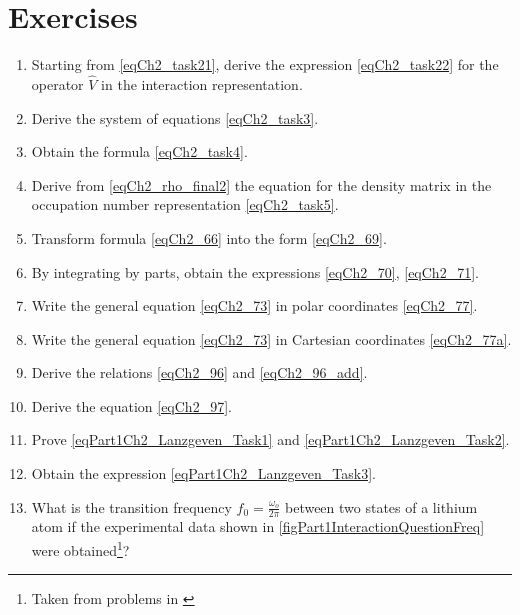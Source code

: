 \section{Exercises}
\begin{enumerate}
\item Starting from \eqref{eqCh2_task21}, derive the expression
  \eqref{eqCh2_task22} for the operator $\hat{V}$ in the interaction
  representation. 
\item Derive the system of equations \eqref{eqCh2_task3}.
\item Obtain the formula \eqref{eqCh2_task4}.
\item Derive from \eqref{eqCh2_rho_final2} the equation for the density
  matrix in the occupation number representation \eqref{eqCh2_task5}. 
\item Transform formula \eqref{eqCh2_66} into the form \eqref{eqCh2_69}.
\item By integrating by parts, obtain the expressions \eqref{eqCh2_70},
  \eqref{eqCh2_71}.
\item Write the general equation \eqref{eqCh2_73} in polar coordinates
  \eqref{eqCh2_77}. 
\item Write the general equation \eqref{eqCh2_73} in Cartesian
  coordinates \eqref{eqCh2_77a}. 
\item Derive the relations \eqref{eqCh2_96} and \eqref{eqCh2_96_add}.
\item Derive the equation \eqref{eqCh2_97}.
\item Prove \eqref{eqPart1Ch2_Lanzgeven_Task1} and \eqref{eqPart1Ch2_Lanzgeven_Task2}.
\item Obtain the expression \eqref{eqPart1Ch2_Lanzgeven_Task3}.
\item \label{qInteractionFreq} What is the transition frequency $f_0 = \frac{\omega_o}{2 \pi}$ between two
  states of a lithium atom if the experimental data shown in
  \autoref{figPart1InteractionQuestionFreq} were obtained\footnote{Taken from problems in \cite{courseIntroQuantumOpticsCoursera}}?
\end{enumerate}

 
